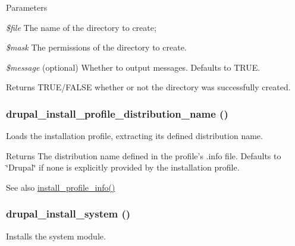 \begin{DoxyParams}{Parameters}
\item[{\em \$file}]The name of the directory to create; \item[{\em \$mask}]The permissions of the directory to create. \item[{\em \$message}](optional) Whether to output messages. Defaults to TRUE.\end{DoxyParams}
\begin{DoxyReturn}{Returns}
TRUE/FALSE whether or not the directory was successfully created. 
\end{DoxyReturn}
\hypertarget{install_8inc_a52c56958ff42269107b5a678e8d95ddc}{
\subsubsection[{drupal\_\-install\_\-profile\_\-distribution\_\-name}]{\setlength{\rightskip}{0pt plus 5cm}drupal\_\-install\_\-profile\_\-distribution\_\-name ()}}
\label{install_8inc_a52c56958ff42269107b5a678e8d95ddc}
Loads the installation profile, extracting its defined distribution name.

\begin{DoxyReturn}{Returns}
The distribution name defined in the profile's .info file. Defaults to \char`\"{}Drupal\char`\"{} if none is explicitly provided by the installation profile.
\end{DoxyReturn}
\begin{DoxySeeAlso}{See also}
\hyperlink{install_8inc_ad035099993d5a0dc4bad7ce81264c88d}{install\_\-profile\_\-info()} 
\end{DoxySeeAlso}
\hypertarget{install_8inc_aab1545a3102caedc018c7d571d6ebf1b}{
\subsubsection[{drupal\_\-install\_\-system}]{\setlength{\rightskip}{0pt plus 5cm}drupal\_\-install\_\-system ()}}
\label{install_8inc_aab1545a3102caedc018c7d571d6ebf1b}
Installs the system module.


